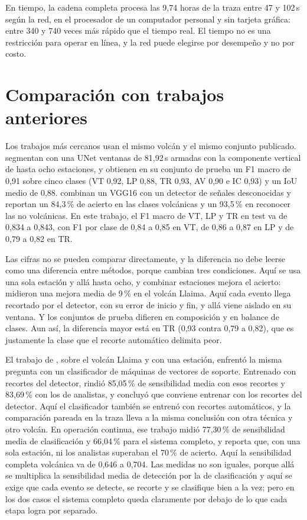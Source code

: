 En tiempo, la cadena completa procesa las 9,74 horas de la traza entre 47 y
102\,s según la red, en el procesador de un computador personal y sin tarjeta
gráfica: entre 340 y 740 veces más rápido que el tiempo real. El tiempo no es
una restricción para operar en línea, y la red puede elegirse por desempeño y
no por costo.

\section{Comparación con trabajos anteriores}
\label{sec:disc-comparacion}

Los trabajos más cercanos usan el mismo volcán y el mismo conjunto publicado.
\textcite{espinosacurilem2026segmentacion} segmentan con una UNet ventanas de
81,92\,s armadas con la componente vertical de hasta ocho estaciones, y
obtienen en su conjunto de prueba un F1 macro de 0,91 sobre cinco clases (VT
0,92, LP 0,88, TR 0,93, AV 0,90 e IC 0,93) y un IoU medio de 0,88.
\textcite{espinosacurilem2025ood} combinan un VGG16 con un detector de señales
desconocidas y reportan un 84,3\,\% de acierto en las clases volcánicas y un
93,5\,\% en reconocer las no volcánicas. En este trabajo, el F1 macro de VT,
LP y TR en test va de 0,834 a 0,843, con F1 por clase de 0,84 a 0,85 en VT, de
0,86 a 0,87 en LP y de 0,79 a 0,82 en TR.

Las cifras no se pueden comparar directamente, y la diferencia no debe leerse
como una diferencia entre métodos, porque cambian tres condiciones. Aquí se
usa una sola estación y allá hasta ocho, y combinar estaciones mejora el
acierto: \textcite{curilem2016estaciones} midieron una mejora media de 9\,\% en
el volcán Llaima. Aquí cada evento llega recortado por el detector, con su
error de inicio y fin, y allá viene aislado en su ventana. Y los conjuntos de
prueba difieren en composición y en balance de clases. Aun así, la diferencia
mayor está en TR (0,93 contra 0,79 a 0,82), que es justamente la clase que el
recorte automático delimita peor.

El trabajo de \textcite{soto2016llaima}, sobre el volcán Llaima y con una
estación, enfrentó la misma pregunta con un clasificador de máquinas de
vectores de soporte. Entrenado con recortes del detector, rindió 85,05\,\% de
sensibilidad media con esos recortes y 83,69\,\% con los de analistas, y
concluyó que conviene entrenar con los recortes del detector. Aquí el
clasificador también se entrenó con recortes automáticos, y la comparación
pareada en la traza lleva a la misma conclusión con otra técnica y otro
volcán. En operación continua, ese trabajo midió 77,30\,\% de sensibilidad
media de clasificación y 66,04\,\% para el sistema completo, y reporta que,
con una sola estación, ni los analistas superaban el 70\,\% de acierto. Aquí la
sensibilidad completa volcánica va de 0,646 a 0,704. Las medidas no son
iguales, porque allá se multiplica la sensibilidad media de detección por la
de clasificación y aquí se exige que cada evento se detecte, se recorte y se
clasifique bien a la vez; pero en los dos casos el sistema completo queda
claramente por debajo de lo que cada etapa logra por separado.

